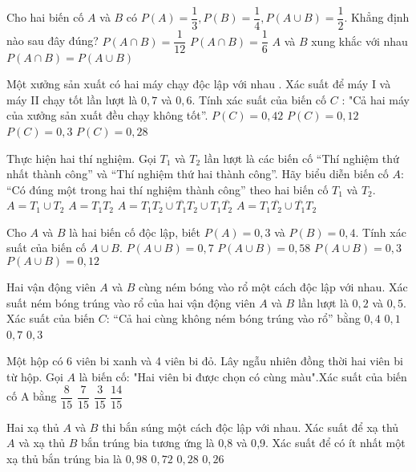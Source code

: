 \begin{ex}
Cho hai biến cố $A$ và $B$ có $P(A)=\dfrac{1}{3},P(B)=\dfrac{1}{4},P(A\cup B)=\dfrac{1}{2}$. Khẳng định nào sau đây đúng?
\choice
{$P\left(A\cap B\right)=\dfrac{1}{12}$}
{$P\left(A\cap B\right)=\dfrac{1}{6}$}
{$A$ và $B$ xung khắc với nhau}
{$P\left(A\cap B\right)=P\left(A\cup B\right)$}
\end{ex}
\begin{ex}
Một xưởng sản xuất có hai máy chạy độc lập với nhau . Xác suất để máy I và máy II chạy tốt lần lượt là $0{,}7$ và $0{,}6$. Tính xác suất của biến cố $C$ : "Cả hai máy của xưởng sản xuất đều chạy không tốt”.
\choice
{$P(C)=0{,}42$}
{$P(C)=0{,}12$}
{$P(C)=0{,}3$}
{$P(C)=0{,}28$}
\end{ex}
\begin{ex}
Thực hiện hai thí nghiệm. Gọi $T_1$ và $T_2$ lần lượt là các biến cố “Thí nghiệm thứ nhất thành công” và “Thí nghiệm thứ hai thành công”. Hãy biểu diễn biến cố $A$: “Có đúng một trong hai thí nghiệm thành công” theo hai biến cố $T_1$ và $T_2$.
\choice
{$A=T_1\cup T_2$}
{$A=T_1T_2$}
{$A=T_1T_2\cup \overline{T_1}T_2\cup T_1\overline{T_2}$}
{$A=T_1\overline{T_2}\cup \overline{T_1}T_2$}
\end{ex}
\begin{ex}
Cho $A$ và $B$ là hai biến cố độc lập, biết $P(A)=0{,}3$ và $P(B)=0{,}4$. Tính xác suất của biến cố $A\cup B$.
\choice
{$P\left(A\cup B\right)=0{,}7$}
{$P\left(A\cup B\right)=0{,}58$}
{$P\left(A\cup B\right)=0{,}3$}
{$P\left(A\cup B\right)=0{,}12$}
\end{ex}
\begin{ex}
Hai vận động viên $A$ và $B$ cùng ném bóng vào rổ một cách độc lập với nhau. Xác suất ném bóng trúng vào rổ của hai vận động viên $A$ và $B$ lần lượt là $0{,}2$ và $0{,}5$. Xác suất của biến $C$: “Cả hai cùng không ném bóng trúng vào rổ” bằng
\choice
{$0{,}4$}
{$0{,}1$}
{$0{,}7$}
{$0{,}3$}
\end{ex}
\begin{ex}
Một hộp có 6 viên bi xanh và 4 viên bi đỏ. Lây ngẫu nhiên đồng thời hai viên bi từ hộp. Gọi ${A}$ là biến cố: "Hai viên bi được chọn có cùng màu".Xác suất của biến cố A bằng
\choice
{$\dfrac{8}{15}$}
{$\dfrac{7}{15}$}
{$\dfrac{3}{15}$}
{$\dfrac{14}{15}$}
\end{ex}
\begin{ex}
Hai xạ thủ ${A}$ và ${B}$ thi bắn súng một cách độc lập với nhau. Xác suất để xạ thủ ${A}$ và xạ thủ ${B}$ bắn trúng bia tương ứng là 0{,}8 và 0{,}9. Xác suất để có ít nhất một xạ thủ bắn trúng bia là
\choice
{$0{,}98$}
{$0{,}72$}
{$0{,}28$}
{$0{,}26$}
\end{ex}
